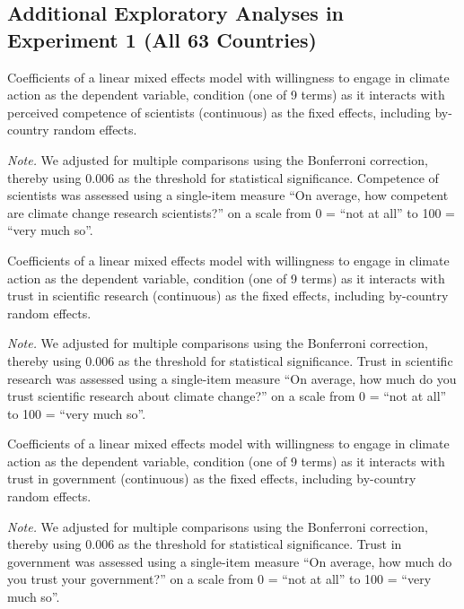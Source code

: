     \subsection{Additional Exploratory Analyses in Experiment 1 (All 63 Countries)}

\begin{table}[H] 
\caption{Coefficients of a linear mixed effects model with willingness to engage in climate action as the dependent variable, condition (one of 9 terms) as it interacts with perceived competence of scientists (continuous) as the fixed effects, including by-country random effects. }
 
\end{table}
\textit{Note.} We adjusted for multiple comparisons using the Bonferroni correction, thereby using 0.006 as the threshold for statistical significance. Competence of scientists was assessed using a single-item measure “On average, how competent are climate change research scientists?” on a scale from 0 = “not at all” to 100 = “very much so”.

\begin{table}[H] 
\caption{Coefficients of a linear mixed effects model with willingness to engage in climate action as the dependent variable, condition (one of 9 terms) as it interacts with trust in scientific research (continuous) as the fixed effects, including by-country random effects.}
 
\end{table}
\textit{Note.} We adjusted for multiple comparisons using the Bonferroni correction, thereby using 0.006 as the threshold for statistical significance. Trust in scientific research was assessed using a single-item measure “On average, how much do you trust scientific research about climate change?” on a scale from 0 = “not at all” to 100 = “very much so”.

\begin{table}[H] 
\caption{Coefficients of a linear mixed effects model with willingness to engage in climate action as the dependent variable, condition (one of 9 terms) as it interacts with trust in government (continuous) as the fixed effects, including by-country random effects.}
 
\end{table}
\textit{Note.} We adjusted for multiple comparisons using the Bonferroni correction, thereby using 0.006 as the threshold for statistical significance. Trust in government was assessed using a single-item measure “On average, how much do you trust your government?” on a scale from 0 = “not at all” to 100 = “very much so”.

